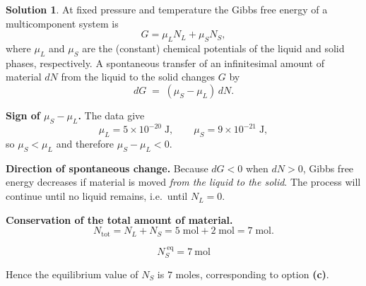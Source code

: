 \documentclass[12pt]{article}
\theoremstyle{definition} %
\newtheorem{solution}{Solution}
\theoremstyle{plain} %
\begin{document}
                        \begin{solution}
                          At fixed pressure and temperature the Gibbs free energy of a multicomponent
                          system is
                          \[
                          G = \mu_L N_L + \mu_S N_S ,
                          \]
                          where \(\mu_L\) and \(\mu_S\) are the (constant) chemical potentials of the
                          liquid and solid phases, respectively.  
                          A spontaneous transfer of an infinitesimal amount of material \(dN\) from the
                          liquid to the solid changes \(G\) by
                          \[
                          dG \;=\; (\mu_S - \mu_L)\,dN .
                          \]
                          
                          \textbf{Sign of \(\mu_S-\mu_L\).}  
                          The data give
                          \[
                          \mu_L = 5\times10^{-20}\;\text{J}, \qquad
                          \mu_S = 9\times10^{-21}\;\text{J},
                          \]
                          so \(\mu_S < \mu_L\) and therefore \(\mu_S-\mu_L < 0\).
                          
                          \textbf{Direction of spontaneous change.}  
                          Because \(dG < 0\) when \(dN>0\), Gibbs free energy decreases if material is
                          moved \emph{from the liquid to the solid}.  The process will continue until no
                          liquid remains, i.e.\ until \(N_L = 0\).
                          
                          \textbf{Conservation of the total amount of material.}  
                          \[
                          N_{\text{tot}} = N_L + N_S = 5\;\text{mol} + 2\;\text{mol} = 7\;\text{mol}.
                          \]
                          
                          \[
                          \boxed{N_S^{\;\text{eq}} = 7\ \text{mol}}
                          \]
                          
                          \bigskip
                          Hence the equilibrium value of \(N_S\) is \(7\) moles, corresponding to
                          option \textbf{(c)}.
                          \end{solution}
\end{document}
